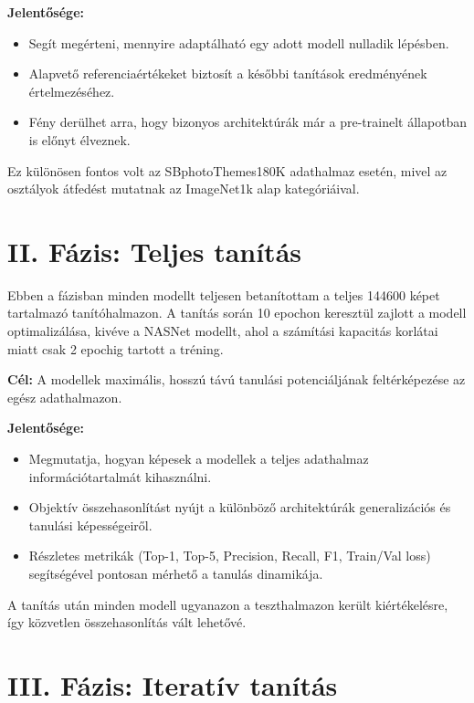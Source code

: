   \textbf{Jelentősége:}
  \begin{itemize}
    \item Segít megérteni, mennyire adaptálható egy adott modell nulladik lépésben.
    \item Alapvető referenciaértékeket biztosít a későbbi tanítások eredményének értelmezéséhez.
    \item Fény derülhet arra, hogy bizonyos architektúrák már a pre-trainelt állapotban is előnyt élveznek.
  \end{itemize}
  
  Ez különösen fontos volt az SBphotoThemes180K adathalmaz esetén, mivel az osztályok átfedést mutatnak az ImageNet1k alap kategóriáival.
  
  
  \section{II. Fázis: Teljes tanítás}
  
  Ebben a fázisban minden modellt teljesen betanítottam a teljes 144600 képet tartalmazó tanítóhalmazon. A tanítás során 10 epochon keresztül zajlott a modell optimalizálása, kivéve a NASNet modellt, ahol a számítási kapacitás korlátai miatt csak 2 epochig tartott a tréning.
  
  \textbf{Cél:} A modellek maximális, hosszú távú tanulási potenciáljának feltérképezése az egész adathalmazon.
  
  \textbf{Jelentősége:}
  \begin{itemize}
    \item Megmutatja, hogyan képesek a modellek a teljes adathalmaz információtartalmát kihasználni.
    \item Objektív összehasonlítást nyújt a különböző architektúrák generalizációs és tanulási képességeiről.
    \item Részletes metrikák (Top-1, Top-5, Precision, Recall, F1, Train/Val loss) segítségével pontosan mérhető a tanulás dinamikája.
  \end{itemize}
  
  A tanítás után minden modell ugyanazon a teszthalmazon került kiértékelésre, így közvetlen összehasonlítás vált lehetővé.
  
  
  \section{III. Fázis: Iteratív tanítás}
  
